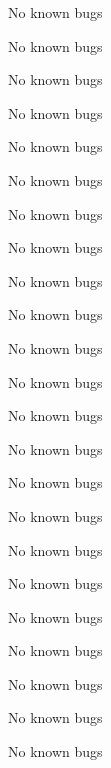
\begin{DoxyRefList}
\item[\label{bug__bug000001}%
\hypertarget{bug__bug000001}{}%
File \hyperlink{buffer16_8c}{buffer16.c} ]No known bugs  
\item[\label{bug__bug000002}%
\hypertarget{bug__bug000002}{}%
File \hyperlink{buffer16_8h}{buffer16.h} ]No known bugs  
\item[\label{bug__bug000003}%
\hypertarget{bug__bug000003}{}%
File \hyperlink{buffer8_8c}{buffer8.c} ]No known bugs  
\item[\label{bug__bug000005}%
\hypertarget{bug__bug000005}{}%
File \hyperlink{buffer__c_8c}{buffer\+\_\+c.c} ]No known bugs  
\item[\label{bug__bug000006}%
\hypertarget{bug__bug000006}{}%
File \hyperlink{buffer__c_8h}{buffer\+\_\+c.h} ]No known bugs  
\item[\label{bug__bug000007}%
\hypertarget{bug__bug000007}{}%
File \hyperlink{buffer__f_8c}{buffer\+\_\+f.c} ]No known bugs  
\item[\label{bug__bug000008}%
\hypertarget{bug__bug000008}{}%
File \hyperlink{buffer__f_8h}{buffer\+\_\+f.h} ]No known bugs  
\item[\label{bug__bug000009}%
\hypertarget{bug__bug000009}{}%
File \hyperlink{console_8c}{console.c} ]No known bugs 

No known bugs 

No known bugs 

No known bugs  
\item[\label{bug__bug000010}%
\hypertarget{bug__bug000010}{}%
File \hyperlink{console_8h}{console.h} ]No known bugs 

No known bugs 

No known bugs  
\item[\label{bug__bug000015}%
\hypertarget{bug__bug000015}{}%
File \hyperlink{gpio_8c}{gpio.c} ]No known bugs  
\item[\label{bug__bug000016}%
\hypertarget{bug__bug000016}{}%
File \hyperlink{gpio_8h}{gpio.h} ]No known bugs  
\item[\label{bug__bug000018}%
\hypertarget{bug__bug000018}{}%
File \hyperlink{rtc_8h}{rtc.h} ]No known bugs  
\item[\label{bug__bug000019}%
\hypertarget{bug__bug000019}{}%
File \hyperlink{statistics_8c}{statistics.c} ]No known bugs  
\item[\label{bug__bug000020}%
\hypertarget{bug__bug000020}{}%
File \hyperlink{statistics_8h}{statistics.h} ]No known bugs  
\item[\label{bug__bug000021}%
\hypertarget{bug__bug000021}{}%
File \hyperlink{timer_8c}{timer.c} ]No known bugs  
\item[\label{bug__bug000022}%
\hypertarget{bug__bug000022}{}%
File \hyperlink{timer_8h}{timer.h} ]No known bugs  
\item[\label{bug__bug000023}%
\hypertarget{bug__bug000023}{}%
File \hyperlink{uart_8c}{uart.c} ]No known bugs  
\item[\label{bug__bug000024}%
\hypertarget{bug__bug000024}{}%
File \hyperlink{uart_8h}{uart.h} ]No known bugs 
\end{DoxyRefList}